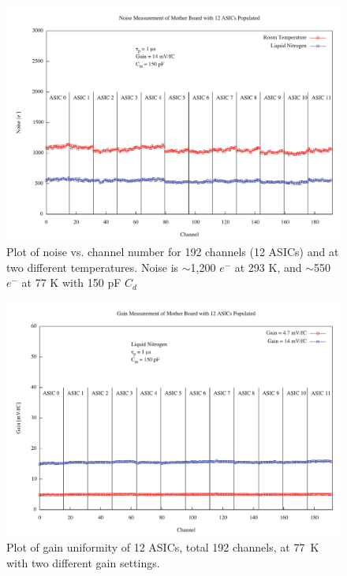 \begin{figure}
\begin{center}
\includegraphics[scale=0.4]{figures/noise.pdf}
\end{center}
\caption{\label{fig:fignoise}Plot of noise vs. channel number for 192 channels (12 ASICs) and at two different temperatures. Noise is $\sim$1,200 $e^{-}$ at 293 K, and $\sim$550 $e^{-}$ at 77 K with 150 pF $C_{d}$}
\end{figure}

\begin{figure}
\begin{center}
\includegraphics[scale=0.4]{figures/gain.pdf}
\end{center}
\caption{\label{fig:figgain}Plot of gain uniformity of 12 ASICs, total 192 channels, at 77~K with two different gain settings.}
\end{figure}

